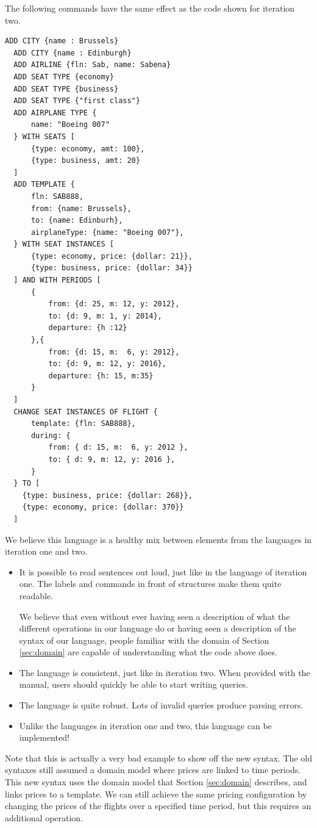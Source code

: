 The following commands have the same effect as the code shown for iteration two.
\begin{lstlisting}[language=airyscript,frame=single]
  ADD CITY {name : Brussels}
  ADD CITY {name : Edinburgh}
  ADD AIRLINE {fln: Sab, name: Sabena}
  ADD SEAT TYPE {economy}
  ADD SEAT TYPE {business}
  ADD SEAT TYPE {"first class"}
  ADD AIRPLANE TYPE {
      name: "Boeing 007"
  } WITH SEATS [
      {type: economy, amt: 100},
      {type: business, amt: 20}
  ]
  ADD TEMPLATE {
      fln: SAB888,
      from: {name: Brussels},
      to: {name: Edinburh},
      airplaneType: {name: "Boeing 007"},
  } WITH SEAT INSTANCES [
      {type: economy, price: {dollar: 21}},
      {type: business, price: {dollar: 34}}
  ] AND WITH PERIODS [
      {
          from: {d: 25, m: 12, y: 2012},
          to: {d: 9, m: 1, y: 2014},
          departure: {h :12}
      },{
          from: {d: 15, m:  6, y: 2012},
          to: {d: 9, m: 12, y: 2016},
          departure: {h: 15, m:35}
      }
  ]
  CHANGE SEAT INSTANCES OF FLIGHT {
      template: {fln: SAB888},
      during: {
          from: { d: 15, m:  6, y: 2012 },
          to: { d: 9, m: 12, y: 2016 },
      }
  } TO [
    {type: business, price: {dollar: 268}},
    {type: economy, price: {dollar: 370}}
  ]
\end{lstlisting}
We believe this language is a healthy mix between elements from the languages in
iteration one and two.
\begin{itemize}
  \item It is possible to read sentences out loud, just like in the language of
    iteration one. The labels and commands in front of structures make them
    quite readable.

    We believe that even without ever having seen a description of what the
    different operations in our language do or having seen a
    description of the syntax of our language, people familiar with the domain
    of Section \ref{sec:domain} are capable of understanding what the code above
    does.
  \item The language is consistent, just like in iteration two. When provided
    with the manual, users should quickly be able to start writing queries.
  \item The language is quite robust. Lots of invalid queries produce parsing
    errors.
  \item Unlike the languages in iteration one and two, this language can be
    implemented!
\end{itemize}
Note that this is actually a very bad example to show off the new syntax.  The
old syntaxes still assumed a domain model where prices are linked to time
periods. This new syntax uses the domain model that Section \ref{sec:domain}
describes, and links prices to a template. We can still achieve the same pricing
configuration by changing the prices of the flights over a specified time
period, but this requires an additional operation.


